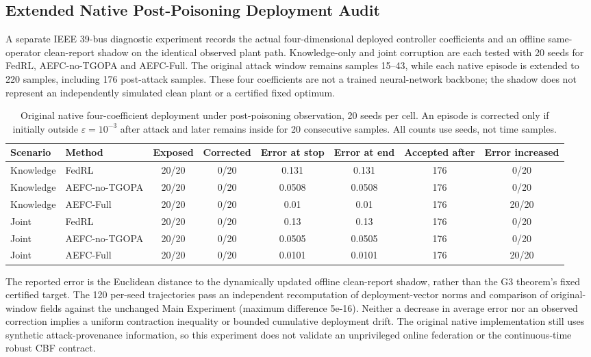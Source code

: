 \subsection{Extended Native Post-Poisoning Deployment Audit}
\label{subsec:native-postpoison}
A separate IEEE 39-bus diagnostic experiment records the actual four-dimensional deployed controller coefficients and an offline same-operator clean-report shadow on the identical observed plant path. Knowledge-only and joint corruption are each tested with 20 seeds for FedRL, AEFC-no-TGOPA and AEFC-Full. The original attack window remains samples 15--43, while each native episode is extended to 220 samples, including 176 post-attack samples. These four coefficients are not a trained neural-network backbone; the shadow does not represent an independently simulated clean plant or a certified fixed optimum.
\begin{table}[t]
\centering
\caption{Original native four-coefficient deployment under post-poisoning observation, 20 seeds per cell. An episode is corrected only if initially outside $\varepsilon=10^{-3}$ after attack and later remains inside for 20 consecutive samples. All counts use seeds, not time samples.}
\label{tab:native-postpoison}
\scriptsize
\begin{tabular}{@{}llcccccc@{}}
\toprule
Scenario & Method & Exposed & Corrected & Error at stop & Error at end & Accepted after & Error increased\\
\midrule
Knowledge & FedRL & 20/20 & 0/20 & 0.131 & 0.131 & 176 & 0/20\\
Knowledge & AEFC-no-TGOPA & 20/20 & 0/20 & 0.0508 & 0.0508 & 176 & 0/20\\
Knowledge & AEFC-Full & 20/20 & 0/20 & 0.01 & 0.01 & 176 & 20/20\\
Joint & FedRL & 20/20 & 0/20 & 0.13 & 0.13 & 176 & 0/20\\
Joint & AEFC-no-TGOPA & 20/20 & 0/20 & 0.0505 & 0.0505 & 176 & 0/20\\
Joint & AEFC-Full & 20/20 & 0/20 & 0.0101 & 0.0101 & 176 & 20/20\\
\bottomrule
\end{tabular}
\end{table}
The reported error is the Euclidean distance to the dynamically updated offline clean-report shadow, rather than the G3 theorem's fixed certified target. The 120 per-seed trajectories pass an independent recomputation of deployment-vector norms and comparison of original-window fields against the unchanged Main Experiment (maximum difference 5e-16). Neither a decrease in average error nor an observed correction implies a uniform contraction inequality or bounded cumulative deployment drift. The original native implementation still uses synthetic attack-provenance information, so this experiment does not validate an unprivileged online federation or the continuous-time robust CBF contract.
